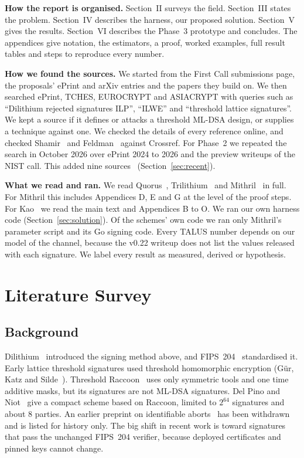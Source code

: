 \documentclass[10pt,conference,a4paper]{IEEEtran}
\begin{document}
\textbf{How the report is organised.} Section~II surveys the field. Section~III states the problem. Section~IV
describes the harness, our proposed solution. Section~V gives the results. Section~VI describes the Phase~3 prototype
and concludes. The appendices give notation, the estimators, a proof, worked examples, full result tables and steps to
reproduce every number.

\textbf{How we found the sources.} We started from the First Call submissions page, the proposals' ePrint and arXiv
entries and the papers they build on. We then searched ePrint, TCHES, EUROCRYPT and ASIACRYPT with queries such as
``Dilithium rejected signatures ILP'', ``ILWE'' and ``threshold lattice signatures''. We kept a source if it defines or
attacks a threshold ML-DSA design, or supplies a technique against one. We checked the details of every reference online,
and checked Shamir~\cite{shamir} and Feldman~\cite{feldman} against Crossref. For Phase~2 we repeated the search in
October 2026 over ePrint 2024 to 2026 and the preview writeups of the NIST call. This added nine
sources~\cite{ringtail,aommlwe,tanuki,topcoat,mldsaas,meng,descent,noisyleak,haetae} (Section~\ref{sec:recent}).

\textbf{What we read and ran.} We read Quorus~\cite{quorus}, Trilithium~\cite{trilithium} and Mithril~\cite{mithril} in
full. For Mithril this includes Appendices D, E and G at the level of the proof steps. For Kao~\cite{kao} we read the main
text and Appendices B to O. We ran our own harness code (Section~\ref{sec:solution}). Of the schemes' own code we ran only
Mithril's parameter script and its Go signing code. Every TALUS number depends on our model of the channel, because the
v0.22 writeup does not list the values released with each signature. We label every result as measured, derived or
hypothesis.

\section{Literature Survey}

\subsection{Background}
Dilithium~\cite{dilithium} introduced the signing method above, and FIPS~204~\cite{fips204} standardised it. Early lattice
threshold signatures used threshold homomorphic encryption (G\"ur, Katz and Silde~\cite{gks}). Threshold
Raccoon~\cite{raccoon} uses only symmetric tools and one time additive masks, but its signatures are not ML-DSA
signatures. Del Pino and Niot~\cite{finally} give a compact scheme based on Raccoon, limited to $2^{64}$ signatures and
about 8 parties. An earlier preprint on identifiable aborts~\cite{dpia} has been withdrawn and is listed for history only.
The big shift in recent work is toward signatures that pass the unchanged FIPS~204 verifier, because deployed
certificates and pinned keys cannot change.
\end{document}
